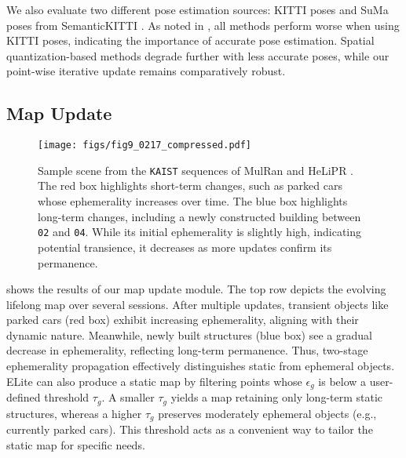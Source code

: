 We also evaluate two different pose estimation sources: KITTI poses \cite{geiger2013vision} and SuMa poses \cite{behley2018efficient} from SemanticKITTI \cite{behley2019semantickitti}. As noted in , all methods perform worse when using KITTI poses, indicating the importance of accurate pose estimation. Spatial quantization-based methods degrade further with less accurate poses, while our point-wise iterative update remains comparatively robust.

\subsection{Map Update}

\begin{figure*}[!t]
    \centering
    \texttt{[image: figs/fig9\_0217\_compressed.pdf]}
    \caption{Sample scene from the \texttt{KAIST} sequences of MulRan \cite{kim2020mulran} and HeLiPR \cite{jung2023helipr}. The red box highlights short-term changes, such as parked cars whose ephemerality increases over time. The blue box highlights long-term changes, including a newly constructed building between \texttt{02} and \texttt{04}. While its initial ephemerality is slightly high, indicating potential transience, it decreases as more updates confirm its permanence.}
    \label{fig:eph_change}
    \vspace{-5mm}
\end{figure*}

 shows the results of our map update module. The top row depicts the evolving lifelong map over several sessions. After multiple updates, transient objects like parked cars (red box) exhibit increasing ephemerality, aligning with their dynamic nature. Meanwhile, newly built structures (blue box) see a gradual decrease in ephemerality, reflecting long-term permanence. Thus, two-stage ephemerality propagation effectively distinguishes static from ephemeral objects.  
ELite can also produce a static map by filtering points whose $\epsilon_g$ is below a user-defined threshold $\tau_g$. A smaller $\tau_g$ yields a map retaining only long-term static structures, whereas a higher $\tau_g$ preserves moderately ephemeral objects (e.g., currently parked cars). This threshold acts as a convenient way to tailor the static map for specific needs.

